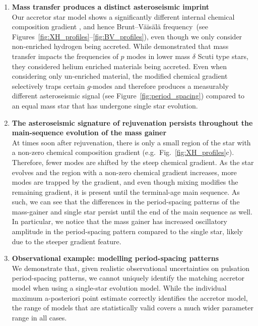 \documentclass[twocolumn, twocolappendix, oneside]{aastex631}
\newcommand{\bvf}{Brunt–Väisälä frequency\xspace}
\newcommand{\gmodes}{$g$-modes\xspace}
\begin{document}
\begin{enumerate}
    \item \textbf{Mass transfer produces a distinct asteroseismic imprint}\\Our accretor star model shows a significantly different internal chemical composition gradient \citep[e.g.][]{Renzo+2021}, and hence \bvf\ (see Figures~\ref{fig:XH_profiles}--\ref{fig:BV_profiles}), even though we only consider non-enriched hydrogen being accreted. While \citet{Miszuda+2021} demonstrated that mass transfer impacts the frequencies of $p$ modes in lower mass $\delta$ Scuti type stars, they considered helium enriched materials being accreted. Even when considering only un-enriched material, the modified chemical gradient selectively traps certain \gmodes and therefore produces a measurably different asteroseismic signal (see Figure~\ref{fig:period_spacing}) compared to an equal mass star that has undergone single star evolution.
    \item {\bf The asteroseismic signature of rejuvenation persists throughout the main-sequence evolution of the mass gainer}\\ At times soon after rejuvenation, there is only a small region of the star with a non-zero chemical composition gradient (e.g.\ Fig.~\ref{fig:XH_profiles}c). Therefore, fewer modes are shifted by the steep chemical gradient. As the star evolves and the region with a non-zero chemical gradient increases, more modes are trapped by the gradient, and even though mixing modifies the remaining gradient, it is present until the terminal-age main sequence. As such, we can see that the differences in the period-spacing patterns of the mass-gainer and single star persist until the end of the main sequence as well. In particular, we notice that the mass gainer has increased oscillatory amplitude in the period-spacing pattern compared to the single star, likely due to the steeper gradient feature.
    \item {\bf Observational example: modelling period-spacing patterns}\\We demonstrate that, given realistic observational uncertainties on pulsation period-spacing patterns, we cannot uniquely identify the matching accretor model when using a single-star evolution model. While the individual maximum a-posteriori point estimate correctly identifies the accretor model, the range of models that are statistically valid covers a much wider parameter range in all cases. 


\end{enumerate}
\end{document}
